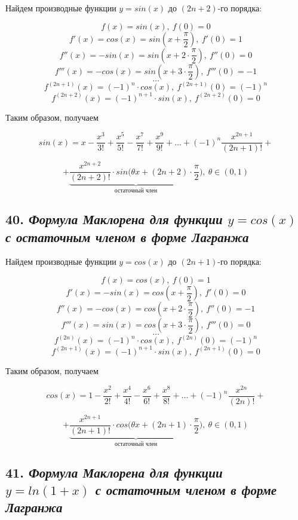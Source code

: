 Найдем производные функции $y = sin(x)$ до $(2n+2)$-го порядка:

$$f(x) = sin(x), \ f(0) = 0$$ $$f'(x) = cos(x) = sin(x + \dfrac{\pi}{2}), \ f'(0)=1$$ $$f''(x) = -sin(x) = sin(x + 2\cdot \dfrac{\pi}{2}), \ f''(0)=0$$ $$f'''(x) = -cos(x) = sin(x + 3\cdot \dfrac{\pi}{2}), \ f'''(0) = -1$$ $$\dots$$ $$f^{(2n + 1)}(x) = (-1)^{n}\cdot cos(x), \ f^{(2n + 1)}(0) = (-1)^{n}$$ $$f^{(2n + 2)}(x) = (-1)^{n+1}\cdot sin(x), \ f^{(2n + 2)}(0) = 0$$

Таким образом, получаем
\begin{mainQuote}

$$ sin(x) = x - \dfrac{x^3}{3!} + \dfrac{x^5}{5!}- \dfrac{x^7}{7!} + \dfrac{x^9}{9!}+...+(-1)^{n}\dfrac{x^{2n+1}}{(2n + 1)!} + $$

$$ + \underbrace{\dfrac{x^{2n+2}}{(2n + 2)!}\cdot sin\bigg(\theta x + (2n + 2)\cdot\dfrac{\pi}{2}\bigg)}_{\text{остаточный \ член}}, \ \theta \in (0, 1) $$
\end{mainQuote}
\newpage 
\subsection*{40. \textit{Формула Маклорена для функции $y = cos(x)$ с остаточным членом в форме Лагранжа}}

Найдем производные функции $y = cos(x)$ до $(2n+1)$-го порядка:

$$f(x) = cos(x), \ f(0) = 1$$ $$f'(x) = -sin(x) = cos(x + \dfrac{\pi}{2}), \ f'(0)=0$$ $$f''(x) = -cos(x) = cos(x + 2\cdot \dfrac{\pi}{2}), \ f''(0)=-1$$ $$f'''(x) = sin(x) = cos(x + 3\cdot \dfrac{\pi}{2}), \ f'''(0) = 0$$ $$\dots$$ $$f^{(2n)}(x) = (-1)^{n}\cdot cos(x), \ f^{(2n)}(0) = (-1)^{n}$$ $$f^{(2n + 1)}(x) = (-1)^{n+1}\cdot sin(x), \ f^{(2n + 1)}(0) = 0$$

Таким образом, получаем
\begin{mainQuote}

$$ cos(x) = 1 - \frac{x^2}{2!} + \frac{x^4}{4!}- \frac{x^6}{6!} + \frac{x^8}{8!}+...+(-1)^{n}\frac{x^{2n}}{(2n)!} + $$

$$ + \underbrace{\frac{x^{2n+1}}{(2n + 1)!}\cdot cos\bigg(\theta x + (2n + 1)\cdot\frac{\pi}{2}\bigg)}_{\text{остаточный \ член}},\  \theta \in (0, 1) $$
\end{mainQuote}
\newpage 
\subsection*{41. \textit{Формула Маклорена для функции $y = ln(1 + x)$ с остаточным членом в форме Лагранжа}}

